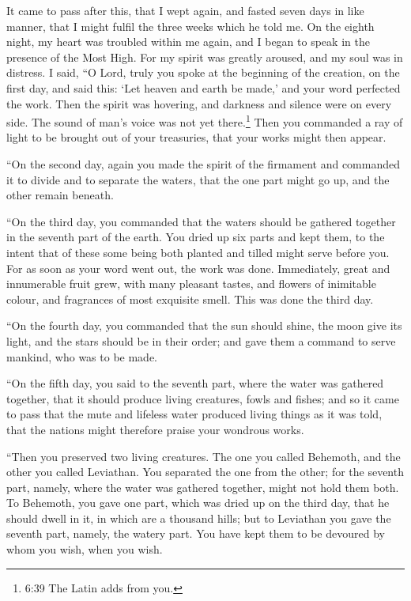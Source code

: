  It came to pass after this, that I wept again, and fasted
seven days in like manner, that I might fulfil the three weeks which he
told me.  On the eighth night, my heart was troubled within
me again, and I began to speak in the presence of the Most High.
 For my spirit was greatly aroused, and my soul was in
distress.  I said, ``O Lord, truly you spoke at the
beginning of the creation, on the first day, and said this: `Let heaven
and earth be made,' and your word perfected the work.  Then
the spirit was hovering, and darkness and silence were on every side.
The sound of man's voice was not yet there.\footnote{6:39 The Latin adds
  from you.}  Then you commanded a ray of light to be
brought out of your treasuries, that your works might then appear.

 ``On the second day, again you made the spirit of the
firmament and commanded it to divide and to separate the waters, that
the one part might go up, and the other remain beneath.

 ``On the third day, you commanded that the waters should
be gathered together in the seventh part of the earth. You dried up six
parts and kept them, to the intent that of these some being both planted
and tilled might serve before you.  For as soon as your
word went out, the work was done.  Immediately, great and
innumerable fruit grew, with many pleasant tastes, and flowers of
inimitable colour, and fragrances of most exquisite smell. This was done
the third day.

 ``On the fourth day, you commanded that the sun should
shine, the moon give its light, and the stars should be in their order;
 and gave them a command to serve mankind, who was to be
made.

 ``On the fifth day, you said to the seventh part, where
the water was gathered together, that it should produce living
creatures, fowls and fishes; and so it came to pass  that
the mute and lifeless water produced living things as it was told, that
the nations might therefore praise your wondrous works.

 ``Then you preserved two living creatures. The one you
called Behemoth, and the other you called Leviathan.  You
separated the one from the other; for the seventh part, namely, where
the water was gathered together, might not hold them both. 
To Behemoth, you gave one part, which was dried up on the third day,
that he should dwell in it, in which are a thousand hills; 
but to Leviathan you gave the seventh part, namely, the watery part. You
have kept them to be devoured by whom you wish, when you wish.

